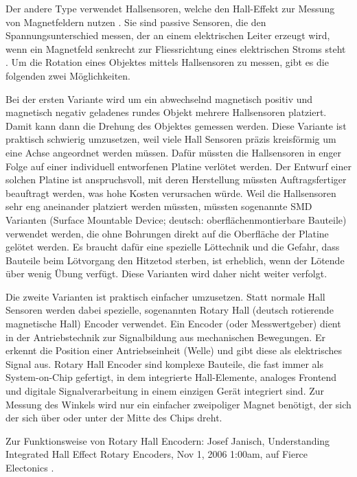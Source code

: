 Der andere Type verwendet Hallsensoren, welche den Hall-Effekt zur Messung von 
Magnetfeldern nutzen \cite{noauthor_hall-sensor_2023}. Sie sind passive Sensoren, die den Spannungsunterschied messen, der an einem elektrischen Leiter erzeugt wird, wenn ein Magnetfeld senkrecht zur Fliessrichtung eines elektrischen Stroms steht \cite{noauthor_alles_nodate}. Um die Rotation eines Objektes mittels Hallsensoren zu messen, gibt es die folgenden zwei Möglichkeiten.

Bei der ersten Variante wird um ein abwechselnd magnetisch positiv und magnetisch negativ geladenes rundes Objekt mehrere Hallsensoren platziert. Damit kann dann die Drehung des Objektes gemessen werden. Diese Variante ist praktisch schwierig umzusetzen, weil viele Hall Sensoren präzis kreisförmig um eine Achse angeordnet werden müssen. Dafür müssten die Hallsensoren in enger Folge auf einer individuell entworfenen Platine verlötet werden. Der Entwurf einer solchen Platine ist anspruchsvoll, mit deren Herstellung müssten Auftragsfertiger beauftragt werden, was hohe Kosten verursachen würde. Weil die Hallsensoren sehr eng aneinander platziert werden müssten, müssten sogenannte SMD Varianten (Surface Mountable Device; deutsch: oberflächenmontierbare Bauteile) verwendet werden, die ohne Bohrungen direkt auf die Oberfläche der Platine gelötet werden. Es braucht dafür eine spezielle Löttechnik und die Gefahr, dass Bauteile beim Lötvorgang den Hitzetod sterben, ist erheblich, wenn der Lötende über wenig Übung verfügt. Diese Varianten wird daher nicht weiter verfolgt.

Die zweite Varianten ist praktisch einfacher umzusetzen. Statt normale Hall Sensoren werden dabei spezielle, sogenannten Rotary Hall (deutsch rotierende magnetische Hall) Encoder verwendet. Ein Encoder (oder Messwertgeber) dient in der Antriebstechnik zur Signalbildung aus mechanischen Bewegungen. Er erkennt die Position einer Antriebseinheit (Welle) und gibt diese als elektrisches Signal aus.\cite{noauthor_was_nodate} Rotary Hall Encoder sind komplexe Bauteile, die fast immer als System-on-Chip gefertigt, in dem integrierte Hall-Elemente, analoges Frontend und digitale Signalverarbeitung in einem einzigen Gerät integriert sind. Zur Messung des Winkels wird nur ein einfacher zweipoliger Magnet benötigt, der sich der sich über oder unter der Mitte des Chips dreht.

Zur Funktionsweise von Rotary Hall Encodern: Josef Janisch, Understanding Integrated Hall Effect Rotary Encoders, Nov 1, 2006 1:00am, auf Fierce Electonics \cite{janisch_understanding_2006}.

